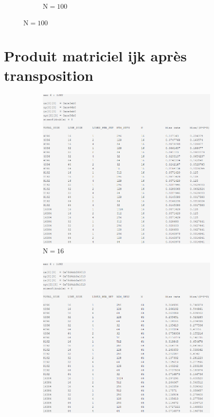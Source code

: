 \documentclass[12pt]{base}
\begin{document}
\begin{figure}[H]
\begin{subfigure}[H]{0.5\linewidth}
    \caption{$\text{N}=100$}
    \label{fig:3_100}
\end{subfigure}
\end{figure}

\newpage
\section{Produit matriciel ijk après transposition}

\begin{figure}[H]
\begin{subfigure}[H]{0.5\linewidth}
    \centering
    \includegraphics[width=0.75\linewidth]{4_ijkt_16.png}
    \caption{$\text{N}=16$}
    \label{fig:4_16}
\end{subfigure}
\begin{subfigure}[H]{0.5\linewidth}
    \centering
    \includegraphics[width=0.75\linewidth]{4_ijkt_64.png}

\end{subfigure}
\end{figure}
\end{document}
